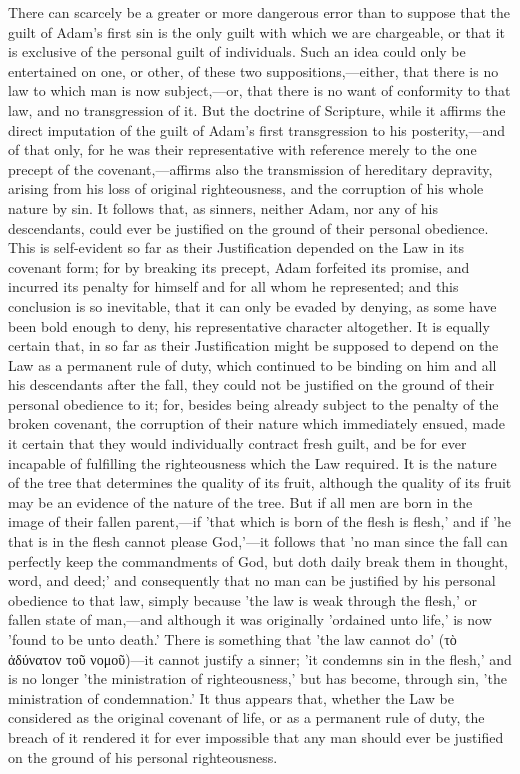 \documentclass[
]{book}
\begin{document}
There can scarcely be a greater or more dangerous error than to suppose that the guilt of Adam's first sin is the only guilt with which we are chargeable, or that it is exclusive of the personal guilt of individuals. Such an idea could only be entertained on one, or other, of these two suppositions,---either, that there is no law to which man is now subject,---or, that there is no want of conformity to that law, and no transgression of it. But the doctrine of Scripture, while it affirms the direct imputation of the guilt of Adam's first transgression to his posterity,---and of that only, for he was their representative with reference merely to the one precept of the covenant,---affirms also the transmission of hereditary depravity, arising from his loss of original righteousness, and the corruption of his whole nature by sin. It follows that, as sinners, neither Adam, nor any of his descendants, could ever be justified on the ground of their personal obedience. This is self-evident so far as their Justification depended on the Law in its covenant form; for by breaking its precept, Adam forfeited its promise, and incurred its penalty for himself and for all whom he represented; and this conclusion is so inevitable, that it can only be evaded by denying, as some have been bold enough to deny, his representative character altogether. It is equally certain that, in so far as their Justification might be supposed to depend on the Law as a permanent rule of duty, which continued to be binding on him and all his descendants after the fall, they could not be justified on the ground of their personal obedience to it; for, besides being already subject to the penalty of the broken covenant, the corruption of their nature which immediately ensued, made it certain that they would individually contract fresh guilt, and be for ever incapable of fulfilling the righteousness which the Law required. It is the nature of the tree that determines the quality of its fruit, although the quality of its fruit may be an evidence of the nature of the tree. But if all men are born in the image of their fallen parent,---if 'that which is born of the flesh is flesh,' and if 'he that is in the flesh cannot please God,'---it follows that 'no man since the fall can perfectly keep the commandments of God, but doth daily break them in thought, word, and deed;' and consequently that no man can be justified by his personal obedience to that law, simply because 'the law is weak through the flesh,' or fallen state of man,---and although it was originally 'ordained unto life,' is now 'found to be unto death.' There is something that 'the law cannot do' (τὸ ἀδύνατον τοῦ νομοῦ)---it cannot justify a sinner; 'it condemns sin in the flesh,' and is no longer 'the ministration of righteousness,' but has become, through sin, 'the ministration of condemnation.' It thus appears that, whether the Law be considered as the original covenant of life, or as a permanent rule of duty, the breach of it rendered it for ever impossible that any man should ever be justified on the ground of his personal righteousness.
\end{document}
